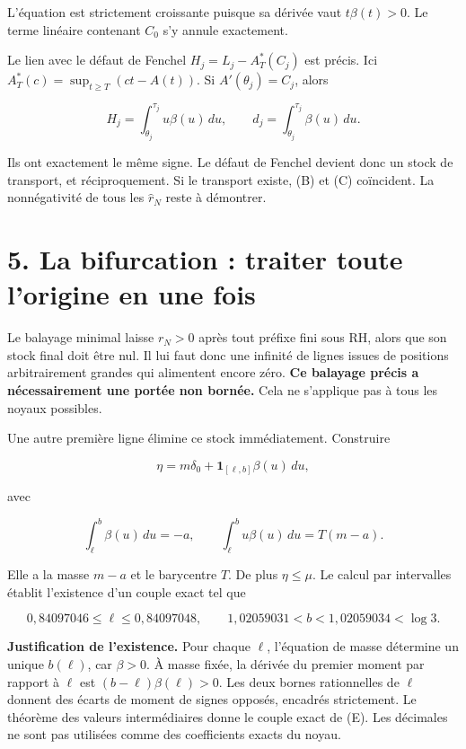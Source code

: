 \documentclass[
  10pt,
  a4paper,
]{article}
\begin{document}
L'équation est strictement croissante puisque sa dérivée vaut
\(t\beta(t)>0\). Le terme linéaire contenant \(C_0\) s'y annule
exactement.

Le lien avec le défaut de Fenchel \(H_j=L_j-A_T^*(C_j)\) est précis. Ici
\(A_T^*(c)=\sup_{t\ge T}(ct-A(t))\). Si \(A'(\theta_j)=C_j\), alors

\[
H_j=\int_{\theta_j}^{\tau_j}u\beta(u)\,du,\qquad
d_j=\int_{\theta_j}^{\tau_j}\beta(u)\,du.
\tag{D}
\]

Ils ont exactement le même signe. Le défaut de Fenchel devient donc un
stock de transport, et réciproquement. Si le transport existe, (B) et
(C) coïncident. La nonnégativité de tous les \(\widehat r_N\) reste à
démontrer.

\hypertarget{la-bifurcation-traiter-toute-lorigine-en-une-fois}{%
\section{5. La bifurcation : traiter toute l'origine en une
fois}\label{la-bifurcation-traiter-toute-lorigine-en-une-fois}}

Le balayage minimal laisse \(r_N>0\) après tout préfixe fini sous RH,
alors que son stock final doit être nul. Il lui faut donc une infinité
de lignes issues de positions arbitrairement grandes qui alimentent
encore zéro. \textbf{Ce balayage précis a nécessairement une portée non
bornée.} Cela ne s'applique pas à tous les noyaux possibles.

Une autre première ligne élimine ce stock immédiatement. Construire

\[
\eta=m\delta_0+\mathbf1_{[\ell,b]}\beta(u)\,du,
\]

avec

\[
\int_\ell^b\beta(u)\,du=-a,\qquad
\int_\ell^bu\beta(u)\,du=T(m-a).
\tag{E}
\]

Elle a la masse \(m-a\) et le barycentre \(T\). De plus \(\eta\le\mu\).
Le calcul par intervalles établit l'existence d'un couple exact tel que

\[
0{,}84097046\le\ell\le0{,}84097048,\qquad
1{,}02059031<b<1{,}02059034<\log3.
\]

\textbf{Justification de l'existence.} Pour chaque \(\ell\), l'équation
de masse détermine un unique \(b(\ell)\), car \(\beta>0\). À masse
fixée, la dérivée du premier moment par rapport à \(\ell\) est
\((b-\ell)\beta(\ell)>0\). Les deux bornes rationnelles de \(\ell\)
donnent des écarts de moment de signes opposés, encadrés strictement. Le
théorème des valeurs intermédiaires donne le couple exact de (E). Les
décimales ne sont pas utilisées comme des coefficients exacts du noyau.
\end{document}
